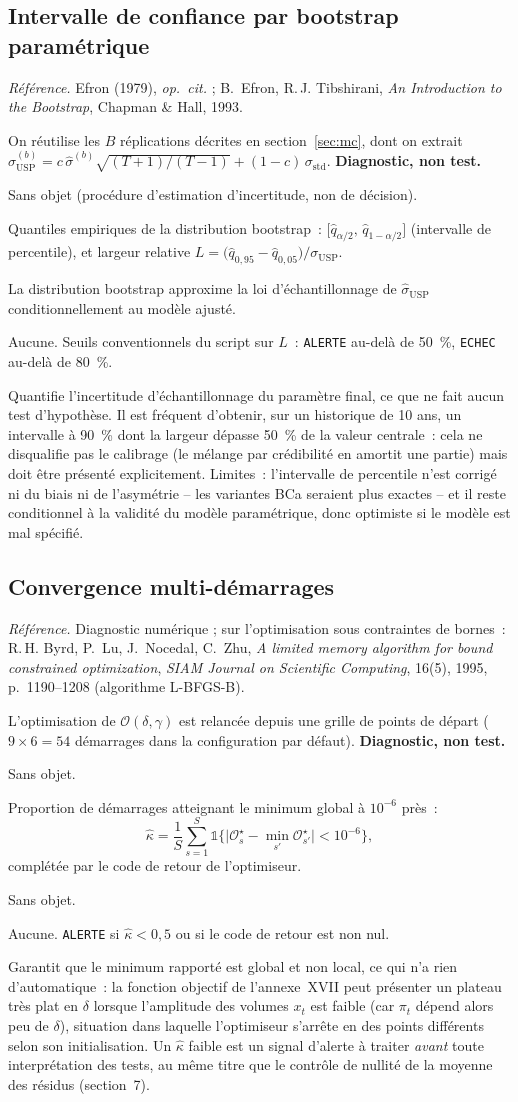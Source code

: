 \documentclass[a4paper,11pt]{article}
\newcommand{\code}[1]{\texttt{\small #1}}
\newcommand{\refl}[1]{{\small\textcolor{maincolor!70!black}{\textit{Référence.} #1}}\par\smallskip}
\newcounter{ficheid}
\newenvironment{fiche}[1]{%
  \stepcounter{ficheid}%
  \phantomsection
  \subsection{#1}%
  \label{fiche:\theficheid}%
}{%
  \end{description}\vspace{0.5em}%
}
\newcommand{\Cadre}{%
  \begin{description}[leftmargin=0pt, style=unboxed, itemsep=3pt, topsep=3pt, parsep=2pt]%
  \item[\textcolor{financeblue}{\textbf{1. Cadre, notations et hypothèses de validité (non testées).}}]}
\newcommand{\Hzero}{\item[\textcolor{financeblue}{\textbf{2. Hypothèse nulle.}}]}
\newcommand{\Stat}{\item[\textcolor{financeblue}{\textbf{3. Statistique de test.}}]}
\newcommand{\Loi}{\item[\textcolor{financeblue}{\textbf{4. Loi sous $H_0$.}}]}
\newcommand{\Pval}{\item[\textcolor{financeblue}{\textbf{5. p-value.}}]}
\newcommand{\Usage}{\item[\textcolor{financeblue}{\textbf{6. Usage et limites.}}]}
\begin{document}
\begin{fiche}{Intervalle de confiance par bootstrap paramétrique}
\refl{Efron (1979), \emph{op.\ cit.} ; B.~Efron, R.\,J. Tibshirani, \emph{An Introduction to the
Bootstrap}, Chapman \& Hall, 1993.}
\Cadre
On réutilise les $B$ réplications décrites en section~\ref{sec:mc}, dont on extrait
$\sigma_{\mathrm{USP}}^{(b)} = c\,\hat\sigma^{(b)}\sqrt{(T+1)/(T-1)} + (1-c)\,\sigma_{\text{std}}$.
\textbf{Diagnostic, non test.}
\Hzero
Sans objet (procédure d'estimation d'incertitude, non de décision).
\Stat
Quantiles empiriques de la distribution bootstrap~:
$\big[\hat q_{\alpha/2},\, \hat q_{1-\alpha/2}\big]$ (intervalle de percentile), et largeur
relative $L = \big(\hat q_{0{,}95} - \hat q_{0{,}05}\big)/\sigma_{\mathrm{USP}}$.
\Loi
La distribution bootstrap approxime la loi d'échantillonnage de $\hat\sigma_{\mathrm{USP}}$
conditionnellement au modèle ajusté.
\Pval
Aucune. Seuils conventionnels du script sur $L$~: \code{ALERTE} au-delà de 50~\%, \code{ECHEC}
au-delà de 80~\%.
\Usage
Quantifie l'incertitude d'échantillonnage du paramètre final, ce que ne fait aucun test
d'hypothèse. Il est fréquent d'obtenir, sur un historique de 10 ans, un intervalle à 90~\% dont la
largeur dépasse 50~\% de la valeur centrale~: cela ne disqualifie pas le calibrage (le mélange par
crédibilité en amortit une partie) mais doit être présenté explicitement. Limites~: l'intervalle
de percentile n'est corrigé ni du biais ni de l'asymétrie -- les variantes BCa seraient plus
exactes -- et il reste conditionnel à la validité du modèle paramétrique, donc optimiste si le
modèle est mal spécifié.
\end{fiche}

\begin{fiche}{Convergence multi-démarrages}
\refl{Diagnostic numérique ; sur l'optimisation sous contraintes de bornes~: R.\,H. Byrd, P.~Lu,
J.~Nocedal, C.~Zhu, \emph{A limited memory algorithm for bound constrained optimization},
\emph{SIAM Journal on Scientific Computing}, 16(5), 1995, p.~1190--1208 (algorithme L-BFGS-B).}
\Cadre
L'optimisation de $\mathcal{O}(\delta,\gamma)$ est relancée depuis une grille de points de départ
($9 \times 6 = 54$ démarrages dans la configuration par défaut). \textbf{Diagnostic, non test.}
\Hzero
Sans objet.
\Stat
Proportion de démarrages atteignant le minimum global à $10^{-6}$ près~:
\[
  \hat\kappa = \frac{1}{S}\sum_{s=1}^{S} \mathbb{1}\Big\{\big|\mathcal{O}_s^{\star} -
  \min_{s'}\mathcal{O}_{s'}^{\star}\big| < 10^{-6}\Big\},
\]
complétée par le code de retour de l'optimiseur.
\Loi
Sans objet.
\Pval
Aucune. \code{ALERTE} si $\hat\kappa < 0{,}5$ ou si le code de retour est non nul.
\Usage
Garantit que le minimum rapporté est global et non local, ce qui n'a rien d'automatique~: la
fonction objectif de l'annexe~XVII peut présenter un plateau très plat en $\delta$ lorsque
l'amplitude des volumes $x_t$ est faible (car $\pi_t$ dépend alors peu de $\delta$), situation
dans laquelle l'optimiseur s'arrête en des points différents selon son initialisation. Un
$\hat\kappa$ faible est un signal d'alerte à traiter \emph{avant} toute interprétation des tests,
au même titre que le contrôle de nullité de la moyenne des résidus (section~7).
\end{fiche}
\end{document}
